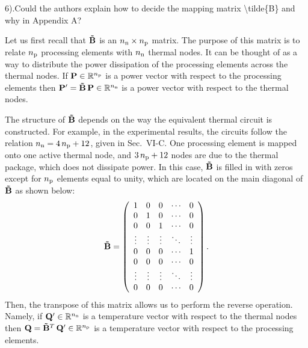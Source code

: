 \begin{reviewer}
6).Could the authors explain how to decide the mapping matrix \textbackslash{}tilde\{B\} and why in Appendix A?
\end{reviewer}
\begin{authors}
Let us first recall that $\mM$ is an ${n_\text{n}} \times {n_\text{p}}$ matrix.
The purpose of this matrix is to relate ${n_\text{p}}$ processing elements with ${n_\text{n}}$ thermal nodes.
It can be thought of as a way to distribute the power dissipation of the processing elements across the thermal nodes.
If $\mathbf{P} \in \mathbb{R}^{n_\text{p}}$ is a power vector with respect to the processing elements then $\v{P}' = \mM \, \v{P} \in \real^\nnodes$ is a power vector with respect to the thermal nodes.

The structure of $\mM$ depends on the way the equivalent thermal circuit is constructed.
For example, in the experimental results, the circuits follow the relation ${n_\text{n}} = 4 \, {n_\text{p}} + 12$, given in Sec.~VI-C.
One processing element is mapped onto one active thermal node, and $3 \, {n_\text{p}} + 12$ nodes are due to the thermal package, which does not dissipate power.
In this case, $\mM$ is filled in with zeros except for ${n_\text{p}}$ elements equal to unity, which are located on the main diagonal of $\mM$ as shown below:
\[
  \mM = \left(
    \begin{array}{ccccc}
      1 & 0 & 0 & \cdots & 0 \\
      0 & 1 & 0 & \cdots & 0 \\
      0 & 0 & 1 & \cdots & 0 \\
      \vdots & \vdots & \vdots & \ddots & \vdots \\
      0 & 0 & 0 & \cdots & 1 \\
      0 & 0 & 0 & \cdots & 0 \\
      \vdots & \vdots & \vdots & \ddots & \vdots \\
      0 & 0 & 0 & \cdots & 0
    \end{array}
  \right).
\]
Then, the transpose of this matrix allows us to perform the reverse operation.
Namely, if $\mathbf{Q}' \in \mathbb{R}^{n_\text{n}}$ is a temperature vector with respect to the thermal nodes then $\v{Q} = \mM^T \, \v{Q}' \in \real^\nprocs$ is a temperature vector with respect to the processing elements.

\begin{actions}
\end{actions}
\end{authors}

